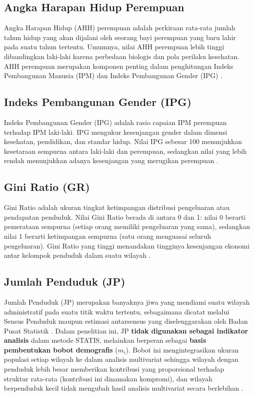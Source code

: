 \subsection{\normalsize Angka Harapan Hidup Perempuan}
Angka Harapan Hidup (AHH) perempuan adalah perkiraan rata-rata jumlah tahun hidup yang akan dijalani oleh seorang bayi perempuan yang baru lahir pada suatu tahun tertentu. Umumnya, nilai AHH perempuan lebih tinggi dibandingkan laki-laki karena perbedaan biologis dan pola perilaku kesehatan. AHH perempuan merupakan komponen penting dalam penghitungan Indeks Pembangunan Manusia (IPM) dan Indeks Pembangunan Gender (IPG) \citep{bpsikr2025, alfia2024}.

\subsection{\normalsize Indeks Pembangunan Gender (IPG)}
Indeks Pembangunan Gender (IPG) adalah rasio capaian IPM perempuan terhadap IPM laki-laki. IPG mengukur kesenjangan gender dalam dimensi kesehatan, pendidikan, dan standar hidup. Nilai IPG sebesar 100 menunjukkan kesetaraan sempurna antara laki-laki dan perempuan, sedangkan nilai yang lebih rendah menunjukkan adanya kesenjangan yang merugikan perempuan \citep{bpsikr2025}.

\subsection{\normalsize Gini Ratio (GR)}
Gini Ratio adalah ukuran tingkat ketimpangan distribusi pengeluaran atau pendapatan penduduk. Nilai Gini Ratio berada di antara 0 dan 1: nilai 0 berarti pemerataan sempurna (setiap orang memiliki pengeluaran yang sama), sedangkan nilai 1 berarti ketimpangan sempurna (satu orang menguasai seluruh pengeluaran). Gini Ratio yang tinggi menandakan tingginya kesenjangan ekonomi antar kelompok penduduk dalam suatu wilayah \citep{bpsikr2025}.

\subsection{\normalsize Jumlah Penduduk (JP)}
Jumlah Penduduk (JP) merupakan banyaknya jiwa yang mendiami suatu wilayah administratif pada suatu titik waktu tertentu, sebagaimana dicatat melalui Sensus Penduduk maupun estimasi antarsensus yang diselenggarakan oleh Badan Pusat Statistik \citep{bpsikr2025}. Dalam penelitian ini, JP \textbf{tidak digunakan sebagai indikator analisis} dalam metode STATIS, melainkan berperan sebagai \textbf{basis pembentukan bobot demografis} ($m_i$). Bobot ini mengintegrasikan ukuran populasi setiap wilayah ke dalam analisis multivariat sehingga wilayah dengan penduduk lebih besar memberikan kontribusi yang proporsional terhadap struktur rata-rata (kontribusi ini dinamakan kompromi), dan wilayah berpenduduk kecil tidak mengubah hasil analisis multivariat secara berlebihan \citep{lavit94}.


